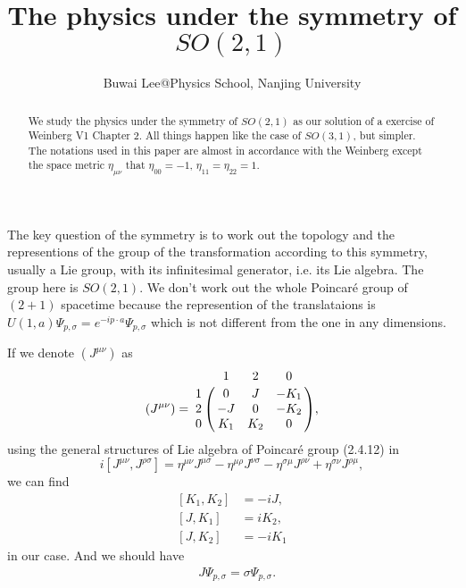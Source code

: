 \documentclass[11pt]{article}
\begin{document}
\title{The physics under the symmetry of $SO\left(2,1\right)$}
\author{Buwai Lee@Physics School, Nanjing University}
\maketitle
\begin{abstract}
	We study the physics under the symmetry of $SO\left(2,1\right)$ as our solution of a exercise of Weinberg V1 Chapter 2. All things happen like the case of $SO\left(3,1\right)$, but simpler. The notations used in this paper are almost in accordance with the Weinberg except the space metric $\eta_{\mu \nu}$ that $\eta_{00}=-1$, $\eta_{11}=\eta_{22}=1$.
\end{abstract}

The key question of the symmetry is to work out the topology and the representions of the group of the transformation according to this symmetry, usually a Lie group, with its infinitesimal generator, i.e. its Lie algebra. The group here is $SO\left(2,1\right)$. We don't work out the whole Poincar\'{e} group of $(2+1)$ spacetime because the represention of the translataions is $U(1,a)\Psi_{p,\sigma}=e^{-ip\cdot a}\Psi_{p,\sigma}$ which is not different from the one in any dimensions.

If we denote $\left(J^{\mu\nu}\right)$ as
\begin{equation}
\left(J^{\mu\nu}\right)=
\bordermatrix{
	   &1      &2     &0\cr
	1  &0      &J     &-K_1\cr
	2  &-J     &0     &-K_2\cr
	0  &K_1    &K_2   &0
},
\end{equation}
using the general structures of Lie algebra of Poincar\'{e} group (2.4.12) in \cite{1}
\[
	i\left[J^{\mu\nu},J^{\rho \sigma}\right]=
	\eta^{\mu\nu}J^{\mu \sigma}-
	\eta^{\mu \rho}J^{\nu \sigma}-
	\eta^{\sigma\mu}J^{\rho \nu}+
	\eta^{\sigma\nu}J^{\rho \mu},
\]
we can find
\begin{align}
	\left[K_1,K_2\right]&=-iJ,\\
	\left[J,K_1\right]&=iK_2,\\
	\left[J,K_2\right]&=-iK_1
\end{align}
in our case. And we should have
\begin{align}
	&J\Psi_{p,\sigma}=\sigma\Psi_{p,\sigma}.
\end{align}
\end{document}

